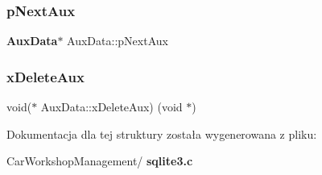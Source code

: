 \subsubsection{pNextAux}
{\footnotesize\ttfamily \textbf{ Aux\+Data}$\ast$ Aux\+Data\+::p\+Next\+Aux}

\mbox{\label{struct_aux_data_a148f6ff0790b7e53857bfc6f4e407bf2}} 
\subsubsection{xDeleteAux}
{\footnotesize\ttfamily void($\ast$ Aux\+Data\+::x\+Delete\+Aux) (void $\ast$)}



Dokumentacja dla tej struktury została wygenerowana z pliku\+:\begin{DoxyCompactItemize}
\item 
Car\+Workshop\+Management/\textbf{ sqlite3.\+c}\end{DoxyCompactItemize}
